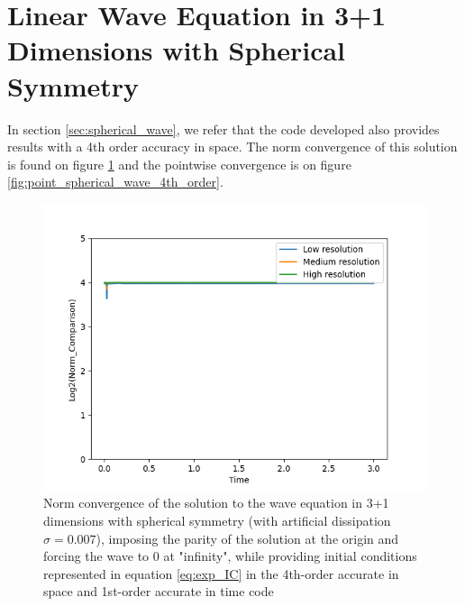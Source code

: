 \clearpage

\section{Linear Wave Equation in 3+1 Dimensions with Spherical Symmetry}

In section \ref{sec:spherical_wave}, we refer that the code developed also provides results with a 4th order accuracy in space. The norm convergence of this solution is found on figure \ref{fig:norm_spherical_wave_4th_order} and the pointwise convergence is on figure \ref{fig:point_spherical_wave_4th_order}.

\begin{figure}[H]
    \centering
    \includegraphics[width=0.9\columnwidth]{Images/spherical_wave-4th-norm.png}
    \caption{Norm convergence of the solution to the wave equation in 3+1 dimensions with spherical symmetry (with artificial dissipation $\sigma = 0.007$), imposing the parity of the solution at the origin and forcing the wave to 0 at "infinity", while providing initial conditions represented in equation \ref{eq:exp_IC} in the 4th-order accurate in space and 1st-order accurate in time code}
    \label{fig:norm_spherical_wave_4th_order}
\end{figure}

